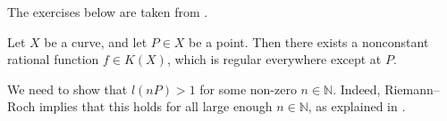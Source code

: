 The exercises below are taken from \cite[Chapter IV]{har77}.

\begin{xca}{1.1}
  Let $X$ be a curve, and let $P \in X$ be a point.
  Then there exists a nonconstant rational function $f \in K(X)$, which is regular everywhere except at $P$.
  
  \begin{solution}
    We need to show that $l(nP) > 1$ for some non-zero $n \in \mathbb{N}$.
    Indeed, Riemann--Roch implies that this holds for all large enough $n \in \mathbb{N}$, as explained in \cite[Remark 1.3.2]{har77}.
  \end{solution}
\end{xca}

